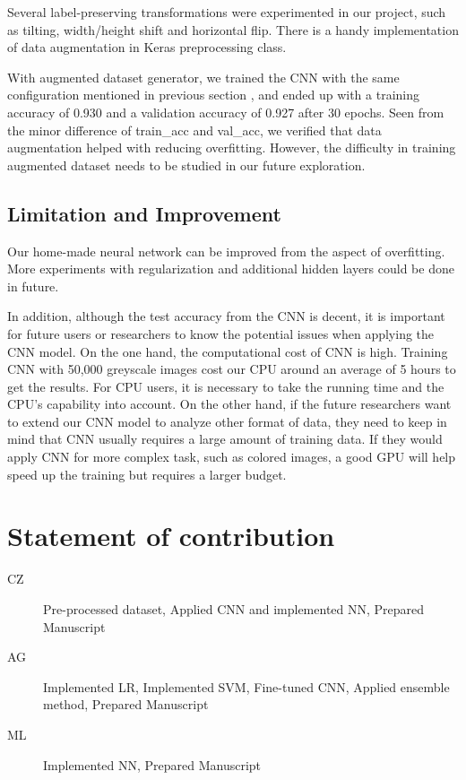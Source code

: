 \documentclass[10pt,conference]{IEEEtran}
\begin{document}
Several label-preserving transformations were experimented in our project, such as tilting, width/height shift and horizontal flip. There is a handy implementation of data augmentation in Keras preprocessing class\cite{chollet2015keras}. 

With augmented dataset generator, we trained the CNN with the same configuration mentioned in previous section , and ended up with a training accuracy of 0.930 and a validation accuracy of 0.927 after 30 epochs. Seen from the minor difference of train\_acc and val\_acc, we verified that data augmentation helped with reducing overfitting. However, the difficulty in training augmented dataset needs to be studied in our future exploration.


\subsection{Limitation and Improvement}
Our home-made neural network can be improved from the aspect of overfitting. More experiments with regularization and additional hidden layers could be done in future. 

In addition, although the test accuracy from the CNN is decent, it is important for future users or researchers to know the potential issues when applying the CNN model. On the one hand, the computational cost of CNN is high. Training CNN with 50,000 greyscale images cost our CPU around an average of 5 hours to get the results. For CPU users, it is necessary to take the running time and the CPU's capability into account. On the other hand, if the future researchers want to extend our CNN model to analyze other format of data, they need to keep in mind that CNN usually requires a large amount of training data. If they would apply CNN for more complex task, such as colored images, a good GPU will help speed up the training but requires a larger budget. 

\section{Statement of contribution}

\begin{description}
\item[CZ] Pre-processed dataset, Applied CNN and implemented NN, Prepared Manuscript
\item[AG] Implemented LR, Implemented SVM, Fine-tuned CNN, Applied ensemble method, Prepared Manuscript
\item[ML] Implemented NN, Prepared Manuscript
\end{description}
\end{document}
